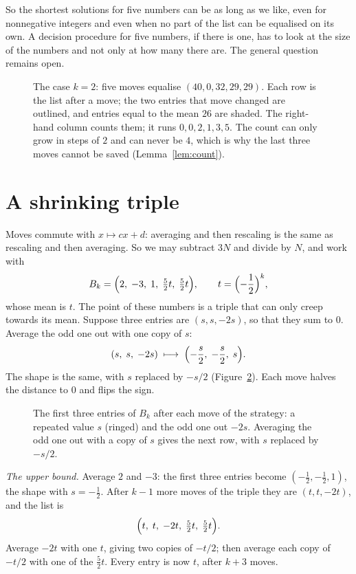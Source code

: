 \documentclass[11pt]{article}
\theoremstyle{remark}
\begin{document}
So the shortest solutions for five numbers can be as long as we like, even for nonnegative integers and even
when no part of the list can be equalised on its own. A decision procedure for five numbers, if there is one,
has to look at the size of the numbers and not only at how many there are. The general question remains
open.

\begin{figure}[ht]
\centering

\caption{The case $k=2$: five moves equalise $(40,0,32,29,29)$. Each row is the list after a move; the two
entries that move changed are outlined, and entries equal to the mean $26$ are shaded. The right-hand column
counts them; it runs $0,0,2,1,3,5$. The count can only grow in steps of $2$ and can never be $4$, which is
why the last three moves cannot be saved (Lemma~\ref{lem:count}).}
\label{fig:moves}
\end{figure}

\section{A shrinking triple}

Moves commute with $x\mapsto cx+d$: averaging and then rescaling is the same as rescaling and then averaging.
So we may subtract $3N$ and divide by $N$, and work with
\[
B_k=\Bigl(2,\;-3,\;1,\;\tfrac52t,\;\tfrac52t\Bigr),\qquad t=\Bigl(-\frac12\Bigr)^{k},
\]
whose mean is $t$. The point of these numbers is a triple that can only creep towards its mean. Suppose three
entries are $(s,s,-2s)$, so that they sum to $0$. Average the odd one out with one copy of $s$:
\[
(s,\;s,\;-2s)\;\longmapsto\;\Bigl(-\frac s2,\;-\frac s2,\;s\Bigr).
\]
The shape is the same, with $s$ replaced by $-s/2$ (Figure~\ref{fig:triple}). Each move halves the distance
to $0$ and flips the sign.

\begin{figure}[ht]
\centering

\caption{The first three entries of $B_k$ after each move of the strategy: a repeated value $s$ (ringed) and
the odd one out $-2s$. Averaging the odd one out with a copy of $s$ gives the next row, with $s$ replaced by
$-s/2$.}
\label{fig:triple}
\end{figure}

\emph{The upper bound.} Average $2$ and $-3$: the first three entries become $(-\frac12,-\frac12,1)$, the
shape with $s=-\frac12$. After $k-1$ more moves of the triple they are $(t,t,-2t)$, and the list is
\[
\Bigl(t,\;t,\;-2t,\;\tfrac52t,\;\tfrac52t\Bigr).
\]
Average $-2t$ with one $t$, giving two copies of $-t/2$; then average each copy of $-t/2$ with one of the
$\frac52t$. Every entry is now $t$, after $k+3$ moves.
\end{document}
